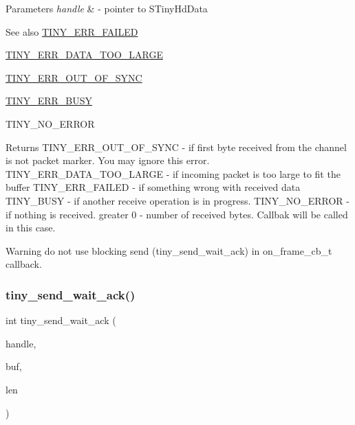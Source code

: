 \begin{DoxyParams}{Parameters}
{\em handle} & -\/ pointer to S\+Tiny\+Hd\+Data \\
\hline
\end{DoxyParams}
\begin{DoxySeeAlso}{See also}
\hyperlink{group__ERROR__FLAGS_ga84e6ca143550038e1a71cf36078d1926}{T\+I\+N\+Y\+\_\+\+E\+R\+R\+\_\+\+F\+A\+I\+L\+ED} 

\hyperlink{group__ERROR__FLAGS_ga7bbe7440d11ad304b0af68e011f4eab7}{T\+I\+N\+Y\+\_\+\+E\+R\+R\+\_\+\+D\+A\+T\+A\+\_\+\+T\+O\+O\+\_\+\+L\+A\+R\+GE} 

\hyperlink{group__ERROR__FLAGS_gae1949de45d9c478830dad9c9b996193a}{T\+I\+N\+Y\+\_\+\+E\+R\+R\+\_\+\+O\+U\+T\+\_\+\+O\+F\+\_\+\+S\+Y\+NC} 

\hyperlink{group__ERROR__FLAGS_ga9b3e170e1c6ce269f216ef4a1ac61995}{T\+I\+N\+Y\+\_\+\+E\+R\+R\+\_\+\+B\+U\+SY} 

T\+I\+N\+Y\+\_\+\+N\+O\+\_\+\+E\+R\+R\+OR 
\end{DoxySeeAlso}
\begin{DoxyReturn}{Returns}
T\+I\+N\+Y\+\_\+\+E\+R\+R\+\_\+\+O\+U\+T\+\_\+\+O\+F\+\_\+\+S\+Y\+NC -\/ if first byte received from the channel is not packet marker. You may ignore this error. T\+I\+N\+Y\+\_\+\+E\+R\+R\+\_\+\+D\+A\+T\+A\+\_\+\+T\+O\+O\+\_\+\+L\+A\+R\+GE -\/ if incoming packet is too large to fit the buffer T\+I\+N\+Y\+\_\+\+E\+R\+R\+\_\+\+F\+A\+I\+L\+ED -\/ if something wrong with received data T\+I\+N\+Y\+\_\+\+B\+U\+SY -\/ if another receive operation is in progress. T\+I\+N\+Y\+\_\+\+N\+O\+\_\+\+E\+R\+R\+OR -\/ if nothing is received. greater 0 -\/ number of received bytes. Callbak will be called in this case. 
\end{DoxyReturn}
\begin{DoxyWarning}{Warning}
do not use blocking send (tiny\+\_\+send\+\_\+wait\+\_\+ack) in on\+\_\+frame\+\_\+cb\+\_\+t callback. 
\end{DoxyWarning}
\mbox{\label{group__HALF__DUPLEX__API_ga5aad8dcb504b80bac923496f2686a6d6}} 
\subsubsection{\texorpdfstring{tiny\+\_\+send\+\_\+wait\+\_\+ack()}{tiny\_send\_wait\_ack()}}
{\footnotesize\ttfamily int tiny\+\_\+send\+\_\+wait\+\_\+ack (\begin{DoxyParamCaption}\item[{\hyperlink{tiny__hd_8h_af9f81ad129b754a780dfca5dcd7f7cf9}{S\+Tiny\+Hd\+Data} $\ast$}]{handle,  }\item[{void $\ast$}]{buf,  }\item[{uint16\+\_\+t}]{len }\end{DoxyParamCaption})}



